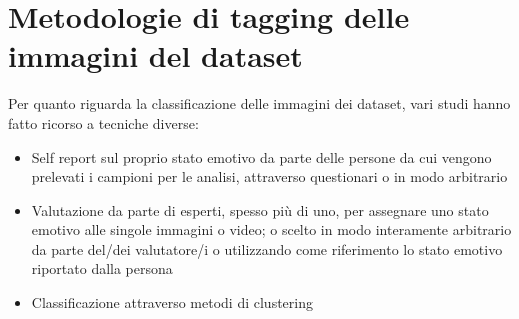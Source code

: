 \section{Metodologie di tagging delle immagini del dataset}
Per quanto riguarda la classificazione delle immagini dei dataset, vari studi hanno fatto ricorso a tecniche diverse:
\begin{itemize}
    \item Self report sul proprio stato emotivo da parte delle persone da cui vengono prelevati i campioni per le analisi, attraverso questionari o in modo arbitrario
    \item Valutazione da parte di esperti, spesso più di uno, per assegnare uno stato emotivo alle singole immagini o video; o scelto in modo interamente arbitrario da parte del/dei valutatore/i o utilizzando come riferimento lo stato emotivo riportato dalla persona
    \item Classificazione attraverso metodi di clustering \cite{FacialExpresRecLocalBinaryPatt}
\end{itemize}

